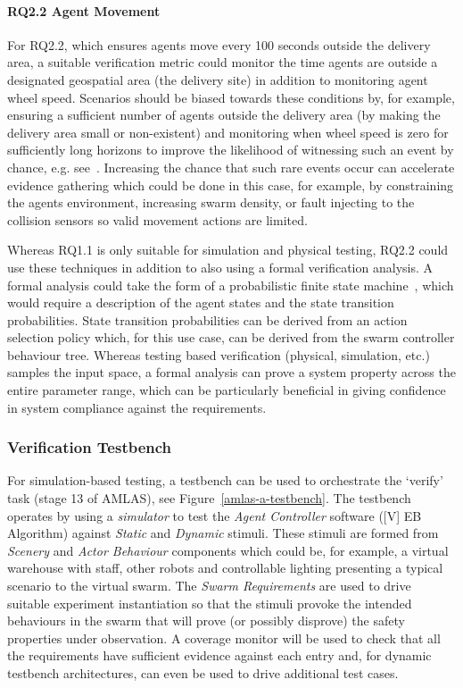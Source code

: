 \documentclass[lettersize,journal]{IEEEtran}
\begin{document}
\paragraph{RQ2.2 Agent Movement}

For RQ2.2, which ensures agents move every 100 seconds outside the delivery area, a suitable verification metric could monitor the time agents are outside a designated geospatial area (the delivery site) in addition to monitoring agent wheel speed. Scenarios should be biased towards these conditions by, for example, ensuring a sufficient number of agents outside the delivery area (by making the delivery area small or non-existent) and monitoring when wheel speed is zero for sufficiently long horizons to improve the likelihood of witnessing such an event by chance, e.g. see~\cite{chance2020agency}. Increasing the chance that such rare events occur can accelerate evidence gathering which could be done in this case, for example, by constraining the agents environment, increasing swarm density, or fault injecting to the collision sensors so valid movement actions are limited. 

Whereas RQ1.1 is only suitable for simulation and physical testing, RQ2.2 could use these techniques in addition to also using a formal verification analysis. A formal analysis could take the form of a probabilistic finite state machine~\cite{Calinescu2018}, which would require a description of the agent states and the state transition probabilities. State transition probabilities can be derived from an action selection policy which, for this use case, can be derived from the swarm controller behaviour tree. Whereas testing based verification (physical, simulation, etc.) samples the input space, a formal analysis can prove a system property across the entire parameter range, which can be particularly beneficial in giving confidence in system compliance against the requirements. 


\subsubsection{Verification Testbench}

For simulation-based testing, a testbench can be used to orchestrate the `verify' task (stage 13 of AMLAS), see Figure~\ref{amlas-a-testbench}. The testbench operates by using a \emph{simulator} to test the \emph{Agent Controller} software ([V] EB Algorithm) against \emph{Static} and \emph{Dynamic} stimuli. These stimuli are formed from \emph{Scenery} and \emph{Actor Behaviour} components which could be, for example, a virtual warehouse with staff, other robots and controllable lighting presenting a typical scenario to the virtual swarm. The \emph{Swarm Requirements} are used to drive suitable experiment instantiation so that the stimuli provoke the intended behaviours in the swarm that will prove (or possibly disprove) the safety properties under observation. A coverage monitor will be used to check that all the requirements have sufficient evidence against each entry and, for dynamic testbench architectures, can even be used to drive additional test cases. 
\end{document}
